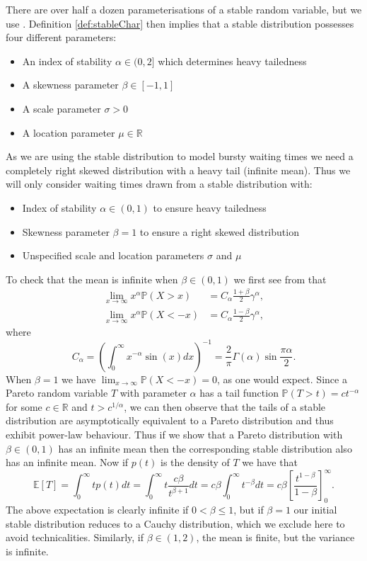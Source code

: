 \documentclass[honours,12pt]{unswthesis}
\newcommand{\R}{\mathbb{R}}
\newcommand{\PP}{\mathbb{P}}
\newcommand{\E}{\mathbb{E}}
\newcommand{\1}{\mathbf 1}
\numberwithin{equation}{section}
\theoremstyle{definition}
\theoremstyle{remark}
\begin{document}
\noindent There are over half a dozen parameterisations of a stable random variable, 
but we use \cite[Def~1.1.6]{Samorodnitsky1994}. Definition \ref{def:stableChar} then implies that a stable distribution possesses four different parameters:
\begin{itemize}
	\item An index of stability $\alpha \in (0,2]$ which determines heavy tailedness 
	\item A skewness parameter $\beta \in [-1,1]$
	\item A scale parameter $\sigma > 0$
	\item A location parameter $\mu \in \R$
\end{itemize}

\noindent As we are using the stable distribution to model bursty waiting times we need a completely right skewed distribution with a heavy tail (infinite mean). Thus we will only consider waiting times drawn from a stable distribution with:
\begin{itemize}
	\item Index of stability $\alpha \in (0,1)$ to ensure heavy tailedness
	\item Skewness parameter $\beta=1$ to ensure a right skewed distribution
	\item Unspecified scale and location parameters $\sigma$ and $\mu$
\end{itemize}

\noindent To check that the mean is infinite when $\beta \in (0,1)$ we first see from \cite{JanickiWeron1994} that 
\begin{align}\label{eq:asymptoticPareto}
\lim_{x\to\infty} x^\alpha\PP(X>x)&=C_\alpha\frac{1+\beta}{2}\gamma^\alpha,\\
\lim_{x\to\infty} x^\alpha\PP(X<-x)&=C_\alpha\frac{1-\beta}{2}\gamma^\alpha,
\end{align}
\noindent where
\[
	C_\alpha=\left(\int^\infty_0 x^{-\alpha} \sin(x) dx  \right)^{-1}=\frac{2}{\pi}\Gamma(\alpha)\sin\frac{\pi\alpha}{2}.
\]
\noindent When $\beta=1$ we have $\lim_{x\to\infty}\PP(X<-x)=0$, as one would expect. Since a Pareto random variable $T$ with parameter $\alpha$ has a tail function $\PP(T>t)=ct^{-\alpha}$ for some $c\in \R$ and $t>c^{1/\alpha}$, we can then observe that the tails of a stable distribution are asymptotically equivalent to a Pareto distribution and thus exhibit power-law behaviour. 
Thus if we show that a Pareto distribution with $\beta \in (0,1)$ has an infinite mean then the corresponding stable distribution also has an infinite mean. Now if $p(t)$ is the density of $T$ we have that 
\[
	\E[T]=\int^\infty_0 tp(t)dt = \int^\infty_0 t\frac{c\beta}{t^{\beta+1}}dt = c\beta\int^\infty_0 t^{-\beta}dt = c\beta \left[\frac{t^{1-\beta}}{1-\beta}\right]^\infty_0.
\]
The above expectation is clearly infinite if $0<\beta\leq1$, but if $\beta=1$ our initial stable distribution reduces to a Cauchy distribution, which we exclude here to avoid technicalities.
Similarly, if $\beta \in (1,2)$, the mean is finite, but the variance is infinite.
\end{document}
